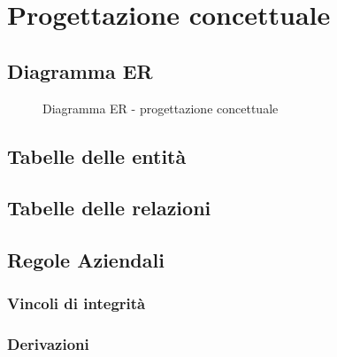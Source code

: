 \section{Progettazione concettuale}
\subsection{Diagramma ER}
\begin{figure}
    \centering
    \caption{Diagramma ER - progettazione concettuale}
    
    \label{fig:er_conp}
\end{figure}

\subsection{Tabelle delle entità}

\subsection{Tabelle delle relazioni}

\subsection{Regole Aziendali}
\subsubsection{Vincoli di integrità}
\subsubsection{Derivazioni}